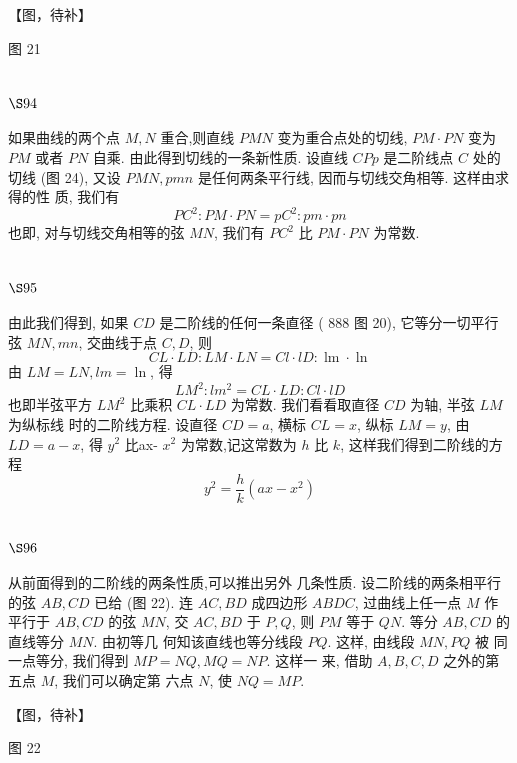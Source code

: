 【图，待补】

图 21

\section{$\S 94$}

如果曲线的两个点 $M, N$ 重合,则直线 $P M N$ 变为重合点处的切线, $P M \cdot P N$ 变为 $P M$ 或者 $P N$ 自乘. 由此得到切线的一条新性质. 设直线 $C P p$ 是二阶线点 $C$ 处的切线 (图 24), 又设 $P M N, p m n$ 是任何两条平行线, 因而与切线交角相等. 这样由求得的性 质, 我们有
\[
P C^{2}: P M \cdot P N=p C^{2}: p m \cdot p n
\]
也即, 对与切线交角相等的弦 $M N$, 我们有 $P C^{2}$ 比 $P M \cdot P N$ 为常数.

\section{$\S 95$}

由此我们得到, 如果 $C D$ 是二阶线的任何一条直径 ( 888 图 20), 它等分一切平行弦 $M N, m n$, 交曲线于点 $C, D$, 则
\[
C L \cdot L D: L M \cdot L N=C l \cdot l D: \operatorname{lm} \cdot \ln
\]
由 $L M=L N, l m=\ln$, 得
\[
L M^{2}: l m^{2}=C L \cdot L D: C l \cdot l D
\]
也即半弦平方 $L M^{2}$ 比乘积 $C L \cdot L D$ 为常数. 我们看看取直径 $C D$ 为轴, 半弦 $L M$ 为纵标线 时的二阶线方程. 设直径 $C D=a$, 横标 $C L=x$, 纵标 $L M=y$, 由 $L D=a-x$, 得 $y^{2}$ 比ax- $x^{2}$ 为常数,记这常数为 $h$ 比 $k$, 这样我们得到二阶线的方程
\[
y^{2}=\frac{h}{k}\left(a x-x^{2}\right)
\]
\section{$\S 96$}

从前面得到的二阶线的两条性质,可以推出另外 几条性质. 设二阶线的两条相平行的弦 $A B, C D$ 已给 (图 22). 连 $A C, B D$ 成四边形 $A B D C$, 过曲线上任一点 $M$ 作平行于 $A B, C D$ 的弦 $M N$, 交 $A C, B D$ 于 $P, Q$, 则 $P M$ 等于 $Q N$. 等分 $A B, C D$ 的直线等分 $M N$. 由初等几 何知该直线也等分线段 $P Q$. 这样, 由线段 $M N, P Q$ 被 同一点等分, 我们得到 $M P=N Q, M Q=N P$. 这样一 来, 借助 $A, B, C, D$ 之外的第五点 $M$, 我们可以确定第 六点 $N$, 使 $N Q=M P$.


【图，待补】

图 22

